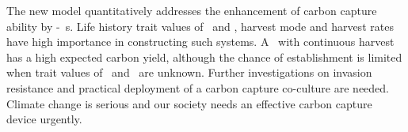 \documentclass[../thesis.tex]{subfiles} %
\begin{document}
The new model quantitatively addresses the enhancement of carbon capture ability by \phy-\bac\ \pbs s.  Life history trait values of \phy\ and \bac, harvest mode and harvest rates have high importance in constructing such systems.  A \pbs\ with continuous harvest has a high expected carbon yield, although the chance of establishment is limited when trait values of \phy\ and \bac\ are unknown.  Further investigations on invasion resistance and practical deployment of a carbon capture co-culture are needed.  Climate change is serious and our society needs an effective carbon capture device urgently.
\end{document}
